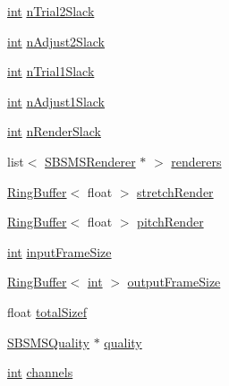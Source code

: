 \begin{DoxyCompactItemize}
\item 
\hyperlink{xmltok_8h_a5a0d4a5641ce434f1d23533f2b2e6653}{int} \hyperlink{class__sbsms___1_1_sub_band_a626dcaee44e0b3f269b385f25559f6ae}{n\+Trial2\+Slack}
\item 
\hyperlink{xmltok_8h_a5a0d4a5641ce434f1d23533f2b2e6653}{int} \hyperlink{class__sbsms___1_1_sub_band_a688bd80cfdca6bf6eb9d5e4a7bd00c23}{n\+Adjust2\+Slack}
\item 
\hyperlink{xmltok_8h_a5a0d4a5641ce434f1d23533f2b2e6653}{int} \hyperlink{class__sbsms___1_1_sub_band_afff276ae74384fc623cb669463d0020f}{n\+Trial1\+Slack}
\item 
\hyperlink{xmltok_8h_a5a0d4a5641ce434f1d23533f2b2e6653}{int} \hyperlink{class__sbsms___1_1_sub_band_a5e901eaf4adb71799a5e69caf8531a76}{n\+Adjust1\+Slack}
\item 
\hyperlink{xmltok_8h_a5a0d4a5641ce434f1d23533f2b2e6653}{int} \hyperlink{class__sbsms___1_1_sub_band_a5a64e1fa6b1dff72b2a5a1876b6a956a}{n\+Render\+Slack}
\item 
list$<$ \hyperlink{class__sbsms___1_1_s_b_s_m_s_renderer}{S\+B\+S\+M\+S\+Renderer} $\ast$ $>$ \hyperlink{class__sbsms___1_1_sub_band_a180d0609f5a12fdcda2b19fd351ccf1c}{renderers}
\item 
\hyperlink{class__sbsms___1_1_ring_buffer}{Ring\+Buffer}$<$ float $>$ \hyperlink{class__sbsms___1_1_sub_band_ae60d27056b5cc96a75ab7bd14e3bd66a}{stretch\+Render}
\item 
\hyperlink{class__sbsms___1_1_ring_buffer}{Ring\+Buffer}$<$ float $>$ \hyperlink{class__sbsms___1_1_sub_band_a31e3fbdc7e7e347735cc8fa3543a9b1b}{pitch\+Render}
\item 
\hyperlink{xmltok_8h_a5a0d4a5641ce434f1d23533f2b2e6653}{int} \hyperlink{class__sbsms___1_1_sub_band_a353a617b641b30680ec68157f7b19330}{input\+Frame\+Size}
\item 
\hyperlink{class__sbsms___1_1_ring_buffer}{Ring\+Buffer}$<$ \hyperlink{xmltok_8h_a5a0d4a5641ce434f1d23533f2b2e6653}{int} $>$ \hyperlink{class__sbsms___1_1_sub_band_a518231d98f7c9c21a33268a24c03a456}{output\+Frame\+Size}
\item 
float \hyperlink{class__sbsms___1_1_sub_band_a933d3f8be98c9ad3bc003fa37ac9bcd2}{total\+Sizef}
\item 
\hyperlink{class__sbsms___1_1_s_b_s_m_s_quality}{S\+B\+S\+M\+S\+Quality} $\ast$ \hyperlink{class__sbsms___1_1_sub_band_ad9c4865b8b6c0e40f6936f057bc811b7}{quality}
\item 
\hyperlink{xmltok_8h_a5a0d4a5641ce434f1d23533f2b2e6653}{int} \hyperlink{class__sbsms___1_1_sub_band_a696155e930117037f0cab10fe5368c37}{channels}

\end{DoxyCompactItemize}
